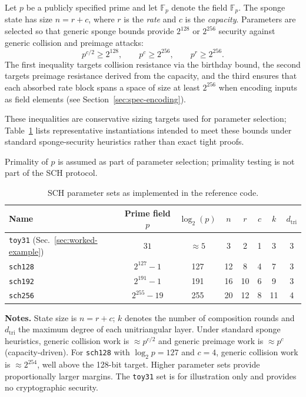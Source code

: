 ﻿\documentclass[english]{aucmcs}
\newcommand{\Fp}{\mathbb{F}_p}
\begin{document}
Let $p$ be a publicly specified prime and let $\Fp$ denote the field $\mathbb{F}_p$.
The sponge state has size $n=r+c$, where $r$ is the \emph{rate} and
$c$ is the \emph{capacity}.
Parameters are selected so that generic sponge bounds provide
$2^{128}$ or $2^{256}$ security against generic collision and preimage attacks:
\[
p^{c/2} \ge 2^{128},
\qquad
p^{c} \ge 2^{256},
\qquad
p^{r} \ge 2^{256}.
\]
The first inequality targets collision resistance via the birthday bound,
the second targets preimage resistance derived from the capacity,
and the third ensures that each absorbed rate block spans a space of size
at least $2^{256}$ when encoding inputs as field elements
(see Section~\ref{sec:spec-encoding}).

These inequalities are conservative sizing targets used for parameter selection;
Table~\ref{tab:params} lists representative instantiations intended to meet
these bounds under standard sponge-security heuristics rather than exact
tight proofs.

Primality of $p$ is assumed as part of parameter selection;
primality testing is not part of the SCH protocol.

\begin{table}[H]
\centering
\caption{SCH parameter sets as implemented in the reference code.}
\label{tab:params}
\begin{tabular}{@{}lccccccc@{}}
\toprule
Name & Prime field $p$ & $\log_2(p)$ & $n$ & $r$ & $c$ & $k$ & $d_{\mathrm{tri}}$ \\
\midrule
\texttt{toy31} (Sec.~\ref{sec:worked-example}) &
$31$ & $\approx 5$ &
3 & 2 & 1 & 3 & 3 \\

\texttt{sch128} &
$2^{127}-1$ & 127 &
12 & 8 & 4 & 7 & 3 \\

\texttt{sch192} &
$2^{191}-1$ & 191 &
16 & 10 & 6 & 9 & 3 \\

\texttt{sch256} &
$2^{255}-19$ & 255 &
20 & 12 & 8 & 11 & 4 \\
\bottomrule
\end{tabular}

\vspace{0.5em}
\begin{minipage}{0.95\linewidth}
\small
\textbf{Notes.}
State size is $n=r+c$; $k$ denotes the number of composition rounds and $d_{\mathrm{tri}}$
the maximum degree of each unitriangular layer. Under standard sponge heuristics,
generic collision work is $\approx p^{c/2}$ and generic preimage work is $\approx p^{c}$
(capacity-driven). For \texttt{sch128} with $\log_2 p=127$ and $c=4$, generic collision
work is $\approx 2^{254}$, well above the 128-bit target. Higher parameter sets provide
proportionally larger margins. The \texttt{toy31} set is for illustration only and
provides no cryptographic security.
\end{minipage}
\end{table}
\end{document}
